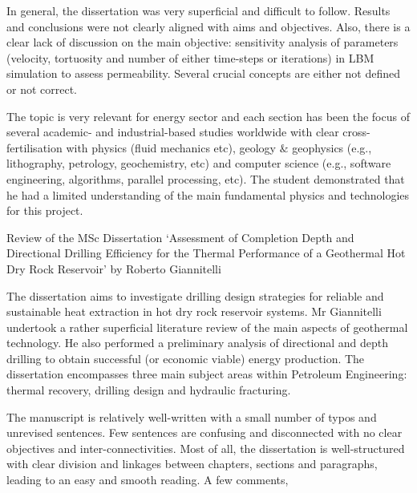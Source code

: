 \documentclass[14pt,twoside]{report}
\begin{document}
In general, the dissertation was very superficial and difficult to follow. Results and conclusions were not clearly aligned with aims and objectives. Also, there is a clear lack of discussion on the main objective: sensitivity analysis of parameters (velocity, tortuosity and number of either time-steps or iterations) in LBM simulation to assess permeability. Several crucial concepts are either not defined or not correct.

The topic is very relevant for energy sector and each section has been the focus of several academic- and industrial-based studies worldwide with clear cross-fertilisation with physics (fluid mechanics etc), geology $\&$ geophysics (e.g., lithography, petrology, geochemistry, etc) and computer science (e.g., software engineering, algorithms, parallel processing, etc). The student demonstrated that he had a limited understanding of the main fundamental physics and technologies for this project.

\clearpage




\bigskip

\begin{center}
{\Large Review of the MSc Dissertation `Assessment of Completion Depth and Directional Drilling Efficiency for the Thermal Performance of a Geothermal Hot Dry Rock Reservoir' by Roberto Giannitelli}
\end{center}

\medskip

The dissertation aims to investigate drilling design strategies for reliable and sustainable heat extraction in hot dry rock reservoir systems. Mr Giannitelli undertook a rather superficial literature review of the main aspects of geothermal technology. He also performed a preliminary analysis of directional and depth drilling to obtain successful (or economic viable) energy production. The dissertation encompasses three main subject areas within Petroleum Engineering: thermal recovery, drilling design and hydraulic fracturing.

The manuscript is relatively well-written with a small number of typos and unrevised sentences. Few sentences are confusing and disconnected with no clear objectives and inter-connectivities. Most of all, the dissertation is well-structured with clear division and linkages between chapters, sections and paragraphs, leading to an easy and smooth reading.  A few comments,
\end{document}
